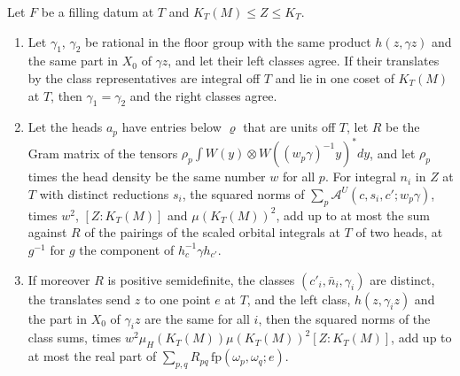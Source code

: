\begin{lemma}\label{lem:classes-point}
Let $F$ be a filling datum at $T$ and $K_T(M)\le Z\le K_T$.
\begin{enumerate}[label=\textup{(\alph*)}]
\item Let $\gamma_1$, $\gamma_2$ be rational in the floor group with the same product $h(z,\gamma z)$ and the same part in $X_0$ of $\gamma z$, and let their left classes agree. If their translates by the class representatives
are integral off $T$ and lie in one coset of $K_T(M)$ at $T$, then $\gamma_1=\gamma_2$ and the right classes agree.
\item Let the heads $a_p$ have entries below $\varrho$ that are units off $T$, let $R$ be the Gram matrix of the tensors $\rho_p\int W(y)\otimes W((w_p\gamma)^{-1}y)^*dy$, and let $\rho_p$ times the head density be the same number $w$ for all
$p$. For integral $n_i$ in $Z$ at $T$ with distinct reductions $s_i$, the squared norms of $\sum_p\mathcal A^U(c,s_i,c';w_p\gamma)$, times $w^2$, $[Z:K_T(M)]$ and $\mu(K_T(M))^2$, add up to at most the sum against $R$ of the
pairings of the scaled orbital integrals at $T$ of two heads, at $g^{-1}$ for $g$ the component of $h_c^{-1}\gamma h_{c'}$.
\item If moreover $R$ is positive semidefinite, the classes $(c'_i,\bar n_i,\gamma_i)$ are distinct, the translates send $z$ to one point $e$ at $T$, and the left class, $h(z,\gamma_iz)$ and the part in $X_0$ of $\gamma_iz$
are the same for all $i$, then the squared norms of the class sums, times $w^2\mu_H(K_T(M))\mu(K_T(M))^2[Z:K_T(M)]$, add up to at most the real part of $\sum_{p,q}R_{pq}\,\mathrm{fp}(\omega_p,\omega_q;e)$.
\end{enumerate}
\end{lemma}

